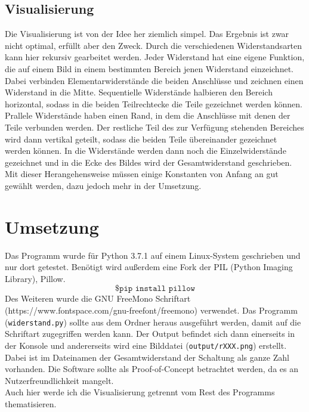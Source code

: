 \documentclass[a4paper,10pt,ngerman]{scrartcl}
\begin{document}
\subsection{Visualisierung}
Die Visualisierung ist von der Idee her ziemlich simpel. Das Ergebnis ist zwar nicht
optimal, erf\"ullt aber den Zweck. Durch die verschiedenen Widerstandsarten kann
hier rekursiv gearbeitet werden. Jeder Widerstand hat eine eigene Funktion, die
auf einem Bild in einem bestimmten Bereich jenen Widerstand einzeichnet. Dabei
verbinden Elementarwiderst\"ande die beiden Anschl\"usse und zeichnen einen Widerstand
in die Mitte. Sequentielle Widerst\"ande halbieren den Bereich horizontal, sodass
in die beiden Teilrechtecke die Teile gezeichnet werden k\"onnen. Prallele Widerst\"ande
haben einen Rand, in dem die Anschl\"usse mit denen der Teile verbunden werden.
Der restliche Teil des zur Verf\"ugung stehenden Bereiches wird dann vertikal geteilt,
sodass die beiden Teile \"ubereinander gezeichnet werden k\"onnen. In die Widerst\"ande
werden dann noch die Einzelwiderst\"ande gezeichnet und in die Ecke des Bildes wird
der Gesamtwiderstand geschrieben.\\
\indent Mit dieser Herangehensweise m\"ussen einige Konstanten von Anfang an gut
gew\"ahlt werden, dazu jedoch mehr in der Umsetzung.
\section{Umsetzung}
Das Programm wurde f\"ur Python 3.7.1 auf einem Linux-System geschrieben 
und nur dort
getestet. Ben\"otigt wird au\ss erdem eine Fork der PIL
(Python Imaging Library), Pillow.
\begin{equation*}
    \texttt{\$ pip install pillow} 
\end{equation*}
Des Weiteren wurde die GNU FreeMono Schriftart 
(https://www.fontspace.com/gnu-freefont/freemono)
verwendet. Das Programm (\texttt{widerstand.py}) sollte aus dem Ordner heraus
ausgef\"uhrt werden, damit auf die Schriftart zugegriffen werden kann.
Der Output befindet sich dann einerseits in der Konsole und andererseits wird
eine Bilddatei (\texttt{output/rXXX.png}) erstellt. Dabei ist im Dateinamen der
Gesamtwiderstand der Schaltung als ganze Zahl vorhanden. Die Software sollte
als Proof-of-Concept betrachtet werden, da es an Nutzerfreundlichkeit mangelt.\\
\indent Auch hier werde ich die Visualisierung getrennt vom Rest des Programms 
thematisieren. 
\end{document}
